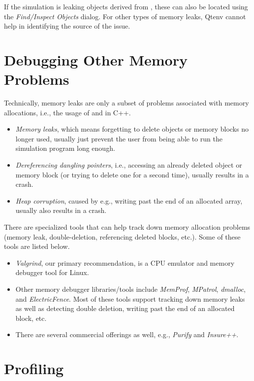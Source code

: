 If the simulation is leaking objects derived from , these
can also be located using the \textit{Find/Inspect Objects} dialog. For other
types of memory leaks, Qtenv cannot help in identifying the source of the issue.


\section{Debugging Other Memory Problems}
\label{sec:run-sim:memory-leaks-and-crashes}

Technically, memory leaks are only a subset of problems associated with memory
allocations, i.e., the usage of  and  in C++.

\begin{itemize}
   \item \textit{Memory leaks}, which means forgetting to delete objects
     or memory blocks no longer used, usually just prevent the user from
     being able to run the simulation program long enough.
   \item \textit{Dereferencing dangling pointers}, i.e., accessing
    an already deleted object or memory block (or trying to delete one
    for a second time), usually results in a crash.
   \item \textit{Heap corruption}, caused by e.g., writing past the end of
   an allocated array, usually also results in a crash.
\end{itemize}


There are specialized tools that can help track down memory allocation
problems (memory leak, double-deletion, referencing deleted blocks, etc.). Some
of these tools are listed below.

\begin{itemize}
  \item \textit{Valgrind}, our primary recommendation, is a CPU emulator and
        memory debugger tool for Linux.
  \item Other memory debugger libraries/tools include \textit{MemProf},
        \textit{MPatrol}, \textit{dmalloc}, and \textit{ElectricFence}.
        Most of these tools support tracking down memory leaks as well as
        detecting double deletion, writing past the end of an allocated block,
        etc.
  \item There are several commercial offerings as well, e.g., \textit{Purify}
        and \textit{Insure++}.
\end{itemize}


\section{Profiling}
\label{sec:run-sim:profiling}

